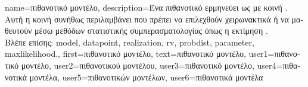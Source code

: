 {name={\foreignlanguage{greek}{πιθανοτικό μοντέλο}},
	description={\foreignlanguage{greek}{Ένα πιθανοτικό}  
		\foreignlanguage{greek}{ερμηνεύει}  \foreignlanguage{greek}{ως}
		  \foreignlanguage{greek}{με κοινή} . \foreignlanguage{greek}{Αυτή η κοινή} 
		 \foreignlanguage{greek}{συνήθως περιλαμβάνει} 
		 \foreignlanguage{greek}{που πρέπει να επιλεχθούν χειρωνακτικά ή να μαθευτούν μέσω μεθόδων στατιστικής  
		συμπερασματολογίας όπως η εκτίμηση}   \cite{LC}.\\
		\foreignlanguage{greek}{Βλέπε επίσης:} \gls{model}, \gls{datapoint}, \gls{realization}, \gls{rv}, \gls{probdist}, \gls{parameter}, \gls{maxlikelihood}.}, 
	first={\foreignlanguage{greek}{πιθανοτικό μοντέλο}}, 
	text={\foreignlanguage{greek}{πιθανοτικό μοντέλο}},
	user1={\foreignlanguage{greek}{πιθανοτικό μοντέλο}}, %
   	user2={\foreignlanguage{greek}{πιθανοτικού μοντέλου}}, %
	user3={\foreignlanguage{greek}{πιθανοτικό μοντέλο}}, %
	user4={\foreignlanguage{greek}{πιθανοτικά μοντέλα}}, %
   	user5={\foreignlanguage{greek}{πιθανοτικών μοντέλων}}, %
	user6={\foreignlanguage{greek}{πιθανοτικά μοντέλα}} %
}

